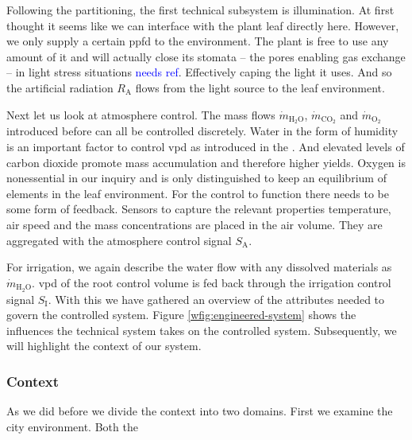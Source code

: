Following the partitioning, the first technical subsystem is illumination.
At first thought it seems like we can interface with the plant leaf directly here.
However, we only supply a certain \ac{ppfd} to the environment.
The plant is free to use any amount of it and will actually close its stomata -- the pores enabling gas exchange -- in light stress situations \textcolor{Blue}{needs ref}.
Effectively caping the light it uses.
And so the artificial radiation $R_\text{A}$ flows from the light source to the leaf environment.

Next let us look at atmosphere control.
The mass flows $\dot{m}_{\text{H}_2\text{O}}$, $\dot{m}_{\text{CO}_2}$ and $\dot{m}_{\text{O}_2}$ introduced before can all be controlled discretely.
Water in the form of humidity is an important factor to control \ac{vpd} as introduced in the .
And elevated levels of carbon dioxide promote mass accumulation and therefore higher yields.
Oxygen is nonessential in our inquiry and is only distinguished to keep an equilibrium of elements in the leaf environment.
For the control to function there needs to be some form of feedback.
Sensors to capture the relevant properties temperature, air speed and the mass concentrations are placed in the air volume.
They are aggregated with the atmosphere control signal $S_\text{A}$.

For irrigation, we again describe the water flow with any dissolved materials as $\dot{m}_{\text{H}_2\text{O}}$.
\ac{vpd} of the root control volume is fed back through the irrigation control signal $S_\text{I}$.
With this we have gathered an overview of the attributes needed to govern the controlled system.
Figure \ref{wfig:engineered-system} shows the influences the technical system takes on the controlled system.
Subsequently, we will highlight the context of our system.



\subsubsection{Context}
As we did before we divide the context into two domains.
First we examine the city environment.
Both the 


